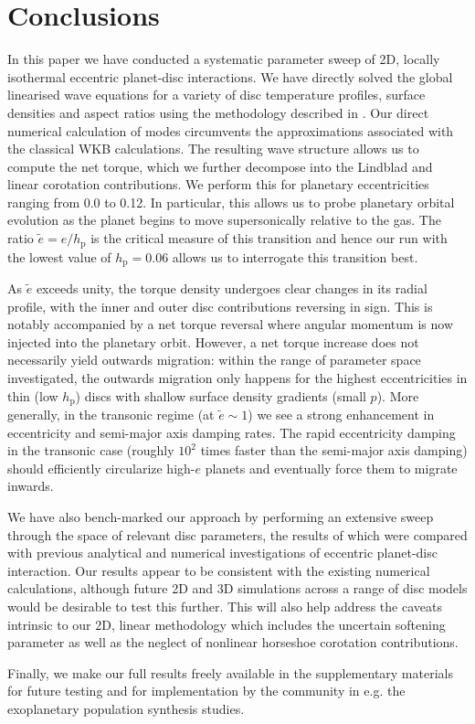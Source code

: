 \section{Conclusions}
\label{sec:conclusion}

In this paper we have conducted a systematic parameter sweep of 2D, locally isothermal eccentric planet-disc interactions. We have directly solved the global linearised wave equations for a variety of disc temperature profiles, surface densities and aspect ratios using the methodology described in \cite{FairbairnRafikov_2022}. Our direct numerical calculation of modes circumvents the approximations associated with the classical WKB calculations. The resulting wave structure allows us to compute the net torque, which we further decompose into the Lindblad and linear corotation contributions. We perform this for planetary eccentricities ranging from 0.0 to 0.12. In particular, this allows us to probe planetary orbital evolution as the planet begins to move supersonically relative to the gas. The ratio $\tilde{e} = e/h_\textrm{p}$ is the critical measure of this transition and hence our run with the lowest value of $h_\textrm{p} = 0.06$ allows us to interrogate this transition best. 

As $\tilde{e}$ exceeds unity, the torque density undergoes clear changes in its radial profile, with the inner and outer disc contributions reversing in sign. This is notably accompanied by a net torque reversal where angular momentum is now injected into the planetary orbit. However, a net torque increase does not necessarily yield outwards migration: within the range of parameter space investigated, the outwards migration only happens for the highest eccentricities in thin (low $h_\mathrm{p}$) discs with shallow surface density gradients (small $p$). More generally, in the transonic regime (at $\tilde e\sim 1$) we see a strong enhancement in eccentricity and semi-major axis damping rates. The rapid eccentricity damping in the transonic case (roughly $10^2$ times faster than the semi-major axis damping) should efficiently circularize high-$e$ planets and eventually force them to migrate inwards. 

We have also bench-marked our approach by performing an extensive sweep through the space of relevant disc parameters, the results of which were compared with previous analytical and numerical investigations of eccentric planet-disc interaction. Our results appear to be consistent with the existing numerical calculations, although future 2D and 3D simulations across a range of disc models would be desirable to test this further. This will also help address the caveats intrinsic to our 2D, linear methodology which includes the uncertain softening parameter as well as the neglect of nonlinear horseshoe corotation contributions.

Finally, we make our full results freely available in the supplementary materials for future testing and for implementation by the community in e.g. the exoplanetary population synthesis studies.


